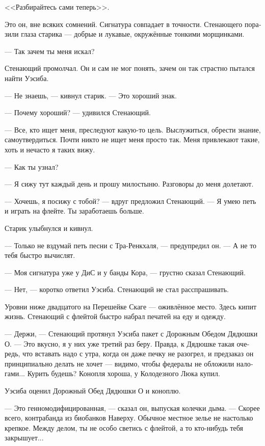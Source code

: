\documentclass[a4paper,12pt,fleqn]{book}\usepackage{cooltooltips}\usepackage{polyglossia}\setdefaultlanguage[babelshorthands=true]{russian}\setotherlanguage{english}\defaultfontfeatures{Ligatures=TeX,Mapping=tex-text} \usepackage{xcolor}\definecolor{lightgray}{HTML}{bbbbbb}\color{lightgray}\newcommand{\ml}[3]{\textenglish{\textcolor{black}{#3}}}
\newcommand{\asterism}{\vspace{1em}{\centering\Large\bfseries$\ast~\ast~\ast$\par}\vspace{1em}}
\begin{document}
<<Разбирайтесь сами теперь>>.

\asterism

Это он, вне всяких сомнений.
Сигнатура совпадает в точности.
Стенающего поразили глаза старика --- добрые и лукавые, окружённые тонкими морщинками.

--- Так зачем ты меня искал?

Стенающий промолчал.
Он и сам не мог понять, зачем он так страстно пытался найти Уэсиба.

--- Не знаешь, --- кивнул старик.
--- Это хороший знак.

--- Почему хороший? --- удивился Стенающий.

--- Все, кто ищет меня, преследуют какую-то цель.
Выслужиться, обрести знание, самоутвердиться.
Почти никто не ищет меня просто так.
Меня привлекают такие, хоть и нечасто я таких вижу.

--- Как ты узнал?

--- Я сижу тут каждый день и прошу милостыню.
Разговоры до меня долетают.

--- Хочешь, я посижу с тобой? --- вдруг предложил Стенающий.
--- Я умею петь и играть на флейте.
Ты заработаешь больше.

Старик улыбнулся и кивнул.

--- Только не вздумай петь песни с Тра-Ренкхаля, --- предупредил он.
--- А не то тебя быстро вычислят.

--- Моя сигнатура уже у ДиС и у банды Кора, --- грустно сказал Стенающий.

--- Нет, --- коротко ответил Уэсиба.
Стенающий не стал расспрашивать.

\asterism

Уровни ниже двадцатого на Перешейке Скаге --- оживлённое место.
Здесь кипит жизнь.
Стенающий с флейтой быстро набрал печатей на еду и одежду.

--- Держи, --- Стенающий протянул Уэсиба пакет с Дорожным Обедом Дядюшки О.
--- Это вкусно, я у них уже третий раз беру.
Правда, к Дядюшке такая очередь, что вставать надо с утра, когда он даже печку не разогрел, и предзаказ он принципиально делать не хочет --- видимо, чтобы федералы не обложили налогами...
Курить будешь?
Конопля хороша, у Колодезного Люка купил.

Уэсиба оценил Дорожный Обед Дядюшки О и коноплю.

--- Это генномодифицированная, --- сказал он, выпуская колечки дыма.
--- Скорее всего, контрабанда из биобанков Наверху.
Обычное местное зелье не настолько крепкое.
Между делом, ты не особо светись с флейтой, а то кто-нибудь тебя закрышует...
\end{document}

